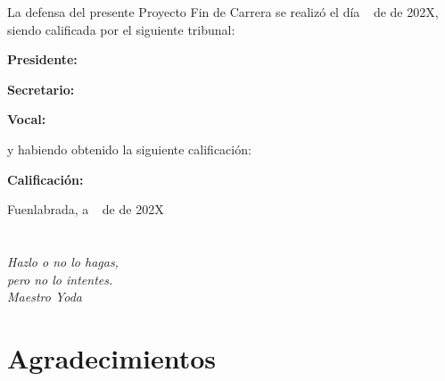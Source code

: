 \documentclass[a4paper, 12pt]{book}
\begin{document}
\vspace{1cm}
La defensa del presente Proyecto Fin de Carrera se realizó el día \qquad$\;\,$ de \qquad\qquad\qquad\qquad \newline de 202X, siendo calificada por el siguiente tribunal:


\vspace{0.5cm}
\textbf{Presidente:}

\vspace{1.2cm}
\textbf{Secretario:}

\vspace{1.2cm}
\textbf{Vocal:}


\vspace{1.2cm}
y habiendo obtenido la siguiente calificación:

\vspace{1cm}
\textbf{Calificación:}


\vspace{1cm}
\begin{flushright}
Fuenlabrada, a \qquad$\;\,$ de \qquad\qquad\qquad\qquad de 202X
\end{flushright}


\chapter*{}
\begin{flushright}
\textit{Hazlo o no lo hagas, \\
pero no lo intentes. \\
Maestro Yoda}
\end{flushright}


\chapter*{Agradecimientos}
\end{document}

